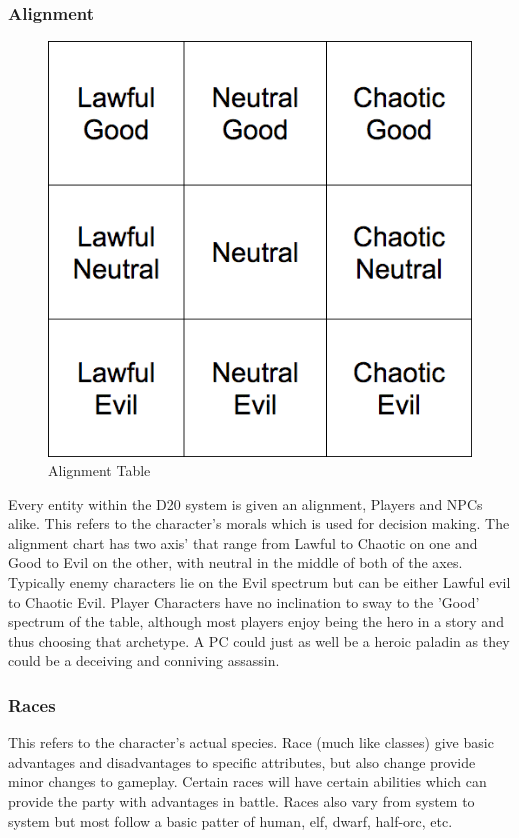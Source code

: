 \documentclass[12pt,a4paper]{report}
\begin{document}
		\subsubsection{Alignment}
			\begin{figure}
				\includegraphics[scale=0.25]{alignment}
				\caption{Alignment Table}
				\label{fig: Alignment Table}
			\end{figure}
			Every entity within the D20 system is given an alignment, Players and NPCs alike. This refers to the character's morals which is used for decision making. The alignment chart has two axis' that range from Lawful to Chaotic on one and Good to Evil on the other, with neutral in the middle of both of the axes. Typically enemy characters lie on the Evil spectrum but can be either Lawful evil to Chaotic Evil. Player Characters have no inclination to sway to the 'Good' spectrum of the table, although most players enjoy being the hero in a story and thus choosing that archetype. A PC could just as well be a heroic paladin as they could be a deceiving and conniving assassin.
		\subsubsection{Races}
			This refers to the character's actual species. Race (much like classes) give basic advantages and disadvantages to specific attributes, but also change provide minor changes to gameplay. Certain races will have certain abilities which can provide the party with advantages in battle. Races also vary from system to system but most follow a basic patter of human, elf, dwarf, half-orc, etc.
			
\end{document}
